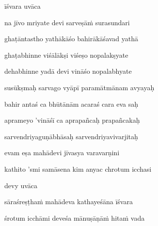 īśvara uvāca~{\dandab}\dontdisplaylinenum 
{}

na jīvo mriyate devi sarveṣāṁ surasundari\thinspace{\danda} \dontdisplaylinenum

ghaṭāntastho yathākāśo bahirākāśavad yathā \veg\dontdisplaylinenum

ghaṭabhinne viśālākṣi viśeṣo nopalakṣyate\thinspace{\dandab} \dontdisplaylinenum

dehabhinne yadā devi vināśo nopalabhyate \veg\dontdisplaylinenum

susūkṣmaḥ sarvago vyāpī paramātmānam avyayaḥ\thinspace{\dandab} \dontdisplaylinenum

bahir antaś ca bhūtānām acaraś cara eva saḥ \veg\dontdisplaylinenum
{}

aprameyo 'vināśī ca aprapañcaḥ prapañcakaḥ\thinspace{\dandab} \dontdisplaylinenum

sarvendriyaguṇābhāsaḥ sarvendriyavivarjitaḥ \veg\dontdisplaylinenum
{}

evam eṣa mahādevi jīvasya varavarṇini\thinspace{\dandab} \dontdisplaylinenum

kathito 'smi samāsena kim anyac chrotum icchasi \veg\dontdisplaylinenum



devy uvāca~{\dandab}\dontdisplaylinenum 

sāraśreṣṭhaṁ mahādeva kathayeśāna īśvara\thinspace{\danda} \dontdisplaylinenum

śrotum icchāmi deveśa mānuṣāṇāṁ hitaṁ vada \veg\dontdisplaylinenum
{}

